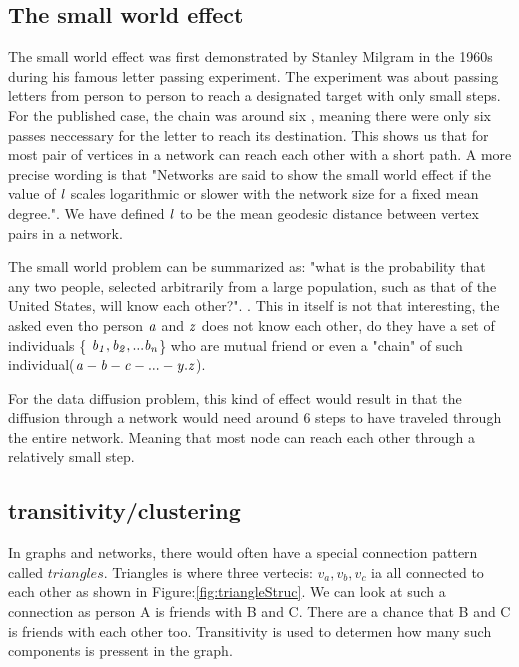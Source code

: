 \subsection{The small world effect}\label{sec:SmallWorldEffect}

The small world effect was first demonstrated by Stanley Milgram in the 1960s during his famous letter passing experiment\cite{SmallWorldProblemSmilgram1960}. The experiment was about passing letters from person to person to reach a designated target with only small steps. For the published case, the chain was around six \cite{Experiment1969}, meaning there were only six passes neccessary for the letter to reach its destination. This shows us that for most pair of vertices in a network can reach each other with a short path. A more precise wording is that "Networks are said to show the small world effect if the value of $\it{l}$ scales logarithmic or slower with the network size for a fixed mean degree."\cite{ComplexNetwork2003}. We have defined $\it{l} $ to be the mean geodesic distance between vertex pairs in a network.

The small world problem can be summarized as: "what is the probability that any two people, selected arbitrarily from a large population, such as that of the United States, will know each other?". \cite{smallworldExperiment1969}. This in itself is not that interesting, the \cite{SmallworldExperiment1969} asked even tho  person $\it{a}$ and $\it{z}$ does not know each other, do they have a set of individuals \{ $\it {b_1, b_2, ... b_n} $\} who are mutual friend or even a "chain" of such individual($\it {a-b-c-...-y.z}$).

For the data diffusion problem, this kind of effect would result in that the diffusion through a network would need around 6 steps to have traveled through the entire network. Meaning that most node can reach each other through a relatively small step.

\subsection{transitivity/clustering}
In graphs and networks, there would often have a special connection pattern called $triangles$. Triangles is where three vertecis: $v_a,v_b,v_c$ ia all connected to each other as shown in Figure:\ref{fig:triangleStruc}. We can look at such a connection as person A is friends with B and C. There are a chance that B and C is friends with each other too. Transitivity is used to determen how many such components is pressent in the graph.  

